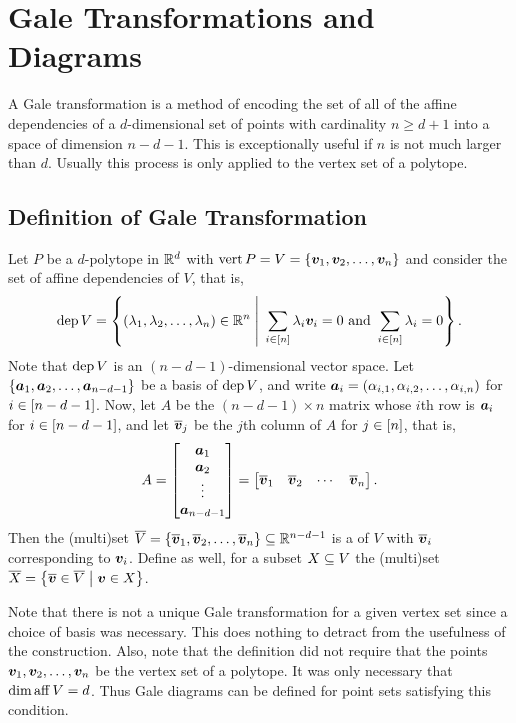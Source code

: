 \chapter{Gale Transformations and Diagrams}

A Gale transformation is a method of encoding the set of all of the affine dependencies of a \(d\)-dimensional set of points with cardinality \(n\ge d+1\) into a space of dimension \(n-d-1\).  This is exceptionally useful if \(n\) is not much larger than \(d\).  Usually this process is only applied to the vertex set of a polytope.

\section{Definition of Gale Transformation}

Let \(P\) be a \(d\)-polytope in \(\mathbb{R}^{d}\) with \(\operatorname{vert} P=V=\left\{\bm{v}_1,\bm{v}_2,\dotsc, \bm{v}_n\right\}\) and consider the set of affine dependencies of \(V\), that is,
    \[
        \dep V
            =   \setb{(\la_1,\la_2\dc\la_n)\in\R n}{\sum_{i\in\brac n}\la_i\ve v_i=0\text{ and }\sum_{i\in\brac n}\la_i=0}.
    \]
Note that \(\operatorname{dep} V\) is an \((n-d-1)\)-dimensional vector space.  Let \(\left\{\bm{a}_1,\bm{a}_2,\dotsc, \bm{a}_{n-d-1}\right\}\) be a basis of \(\operatorname{dep} V\), and write \(\bm{a}_i=(\alpha_{i,1},\alpha_{i,2},\dotsc, \alpha_{i,n})\) for \(i\in\left[n-d-1\right]\).  Now, let \(A\) be the \((n-d-1)\times n\) matrix whose \(i\)th row is \(\bm{a}_i\) for \(i\in\left[n-d-1\right]\), and let \(\overline{\bm{v}}_j\) be the \(j\)th column of \(A\) for \(j\in\left[n\right]\), that is,
    \[
        A
            =
                \begin{bmatrix}
                    \bm{a}_1\\ \bm{a}_2\\ \vdots\\ \bm{a}_{n-d-1}
                \end{bmatrix}
            =
                \begin{bmatrix}
                    \overline{\bm{v}}_1 & \overline{\bm{v}}_2 & \cdots & \overline{\bm{v}}_n
                \end{bmatrix}.
    \]
Then the (multi)set \(\overline{V}=\left\{\overline{\bm{v}}_1, \overline{\bm{v}}_2,\dotsc, \overline{\bm{v}}_n\right\}\subseteq\mathbb{R}^{n-d-1}\) is a  of \(V\) with \(\overline{\bm{v}}_i\) corresponding to \(\bm{v}_i\).  Define as well, for a subset \(X\subseteq V\) the (multi)set \(\ol X=\setb{\ol{\ve v}\in\ol V}{\ve v\in X}\).

Note that there is not a unique Gale transformation for a given vertex set since a choice of basis was necessary.  This does nothing to detract from the usefulness of the construction.  Also, note that the definition did not require that the points \(\bm{v}_1,\bm{v}_2,\dotsc,\bm{v}_n\) be the vertex set of a polytope.  It was only necessary that \(\dim\operatorname{aff} V=d\).  Thus Gale diagrams can be defined for point sets satisfying this condition.

